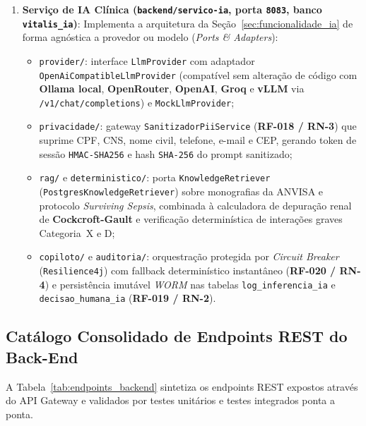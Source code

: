 \begin{enumerate}[leftmargin=*]
    \item \textbf{Serviço de IA Clínica (\texttt{backend/servico-ia}, porta \texttt{8083}, banco \texttt{vitalis\_ia})}:
    Implementa a arquitetura da Seção~\ref{sec:funcionalidade_ia} de forma agnóstica a provedor ou modelo (\textit{Ports \& Adapters}):
    \begin{itemize}[noitemsep]
        \item \texttt{provider/}: interface \texttt{LlmProvider} com adaptador \texttt{OpenAiCompatibleLlmProvider} (compatível sem alteração de código com \textbf{Ollama local}, \textbf{OpenRouter}, \textbf{OpenAI}, \textbf{Groq} e \textbf{vLLM} via \texttt{/v1/chat/completions}) e \texttt{MockLlmProvider};
        \item \texttt{privacidade/}: gateway \texttt{SanitizadorPiiService} (\textbf{RF-018 / RN-3}) que suprime CPF, CNS, nome civil, telefone, e-mail e CEP, gerando token de sessão \texttt{HMAC-SHA256} e hash \texttt{SHA-256} do prompt sanitizado;
        \item \texttt{rag/} e \texttt{deterministico/}: porta \texttt{KnowledgeRetriever} (\texttt{PostgresKnowledgeRetriever}) sobre monografias da ANVISA e protocolo \textit{Surviving Sepsis}, combinada à calculadora de depuração renal de \textbf{Cockcroft-Gault} e verificação determinística de interações graves Categoria~X e D;
        \item \texttt{copiloto/} e \texttt{auditoria/}: orquestração protegida por \textit{Circuit Breaker} (\texttt{Resilience4j}) com fallback determinístico instantâneo (\textbf{RF-020 / RN-4}) e persistência imutável \textit{WORM} nas tabelas \texttt{log\_inferencia\_ia} e \texttt{decisao\_humana\_ia} (\textbf{RF-019 / RN-2}).
    \end{itemize}
\end{enumerate}

\subsection{Catálogo Consolidado de Endpoints REST do Back-End}

A Tabela~\ref{tab:endpoints_backend} sintetiza os endpoints REST expostos através do API Gateway e validados por testes unitários e testes integrados ponta a ponta.

